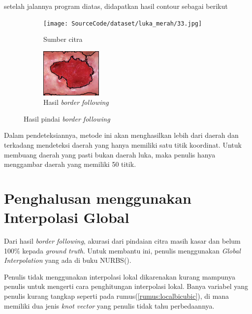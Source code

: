 setelah jalannya program diatas, didapatkan 
hasil contour sebagai berikut
\begin{figure}[H]
	\centering
	\begin{subfigure}{.3\textwidth}
		\centering
		\texttt{[image: SourceCode/dataset/luka\_merah/33.jpg]}
		\caption{Sumber citra}
	\end{subfigure}
	\begin{subfigure}{.4\textwidth}
		\centering
		\includegraphics[keepaspectratio, width=3cm]{gambar/Bab4/Luka_merah_interpolasi.jpg}
		\caption{Hasil \textit{border following}}
	\end{subfigure} 
	\caption{Hasil pindai \textit{border following}}
\end{figure}
Dalam pendeteksiannya, metode ini akan menghasilkan 
lebih dari daerah dan terkadang mendeteksi daerah 
yang hanya memiliki satu titik koordinat. Untuk membuang 
daerah yang pasti bukan daerah luka, maka penulis 
hanya menggambar daerah yang memiliki 50 titik.


\section{Penghalusan menggunakan Interpolasi Global}

Dari hasil \textit{border following}, akurasi dari 
pindaian citra masih kasar dan belum 100$\%$ kepada 
\textit{ground truth}. Untuk membantu ini, penulis 
menggunakan \textit{Global Interpolation} yang ada 
di buku NURBS(\cite{PiegTill96}).

Penulis tidak menggunakan interpolasi lokal dikarenakan 
kurang mampunya penulis untuk mengerti cara penghitungan 
interpolasi lokal. Banya variabel yang penulis kurang tangkap 
seperti pada rumus(\ref{rumus:localbicubic}), di mana memiliki 
dua jenis \textit{knot vector} yang penulis tidak tahu 
perbedaannya.

